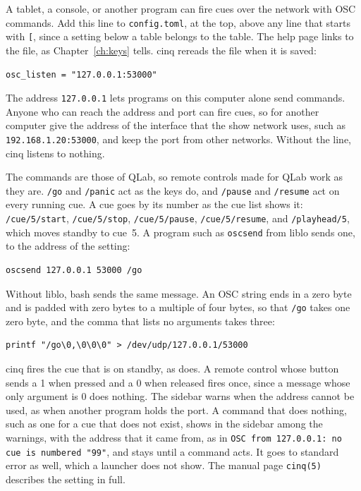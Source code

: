 A tablet, a console, or another program can fire cues over the network with
OSC commands.  Add this line to \texttt{config.toml}, at the top, above any
line that starts with \texttt{[}, since a setting below a table belongs to the
table.  The help page links to the file, as Chapter~\ref{ch:keys} tells.  cinq
rereads the file when it is saved:

\begin{verbatim}
osc_listen = "127.0.0.1:53000"
\end{verbatim}

The address \texttt{127.0.0.1} lets programs on this computer alone send
commands.  Anyone who can reach the address and port can fire cues, so for
another computer give the address of the interface that the show network
uses, such as \texttt{192.168.1.20:53000}, and keep the port from other
networks.  Without the line, cinq listens to nothing.

The commands are those of QLab, so remote controls made for QLab work as they
are.  \texttt{/go} and \texttt{/panic} act as the keys do, and \texttt{/pause}
and \texttt{/resume} act on every running cue.  A cue goes by its number as the
cue list shows it: \texttt{/cue/5/start}, \texttt{/cue/5/stop},
\texttt{/cue/5/pause}, \texttt{/cue/5/resume}, and \texttt{/playhead/5}, which
moves standby to cue~5.  A program such as \texttt{oscsend} from liblo sends
one, to the address of the setting:

\begin{verbatim}
oscsend 127.0.0.1 53000 /go
\end{verbatim}

Without liblo, bash sends the same message.  An OSC string ends in a zero byte
and is padded with zero bytes to a multiple of four bytes, so that \texttt{/go}
takes one zero byte, and the comma that lists no arguments takes three:

\begin{verbatim}
printf "/go\0,\0\0\0" > /dev/udp/127.0.0.1/53000
\end{verbatim}

cinq fires the cue that is on standby, as  does.  A remote control
whose button sends a 1 when pressed and a 0 when released fires once, since a
message whose only argument is 0 does nothing.  The sidebar warns when the
address cannot be used, as when another program holds the port.  A command
that does nothing, such as one for a cue that does not exist, shows in the
sidebar among the warnings, with the address that it came from, as in
\texttt{OSC from 127.0.0.1: no cue is numbered "99"}, and stays until a
command acts.  It goes to standard error as well, which a launcher does not
show.  The manual page \texttt{cinq(5)} describes the setting in full.

